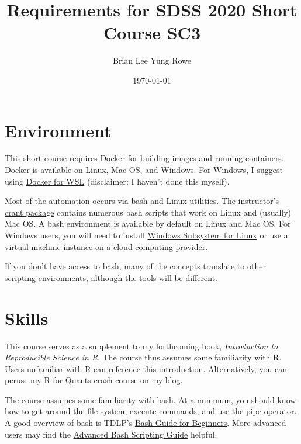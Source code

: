 \documentclass{article}
\title{Requirements for SDSS 2020 Short Course SC3}
\date{\today}
\author{Brian Lee Yung Rowe}
\begin{document}
 
\maketitle 

\section{Environment}
This short course requires Docker for building images and running containers.
\href{https://www.docker.com/products/docker-desktop}{Docker} is available on Linux, Mac OS, and Windows.
For Windows, I suggest using \href{https://code.visualstudio.com/blogs/2020/03/02/docker-in-wsl2}{Docker for WSL}
(disclaimer: I haven't done this myself).

Most of the automation occurs via bash and Linux utilities. 
The instructor's \href{https://github.com/zatonovo/crant}{crant package} 
contains numerous bash scripts that work on Linux and (usually) Mac OS.
A bash environment is available by default on Linux and Mac OS.
For Windows users, you will need to install 
\href{https://docs.microsoft.com/en-us/windows/wsl/install-win10}{Windows Subsystem for Linux} 
or use a virtual machine instance on a cloud computing provider.

If you don't have access to bash, many of the concepts translate to 
other scripting environments, although the tools will be different.

\section{Skills}
This course serves as a supplement to my forthcoming book, 
\emph{Introduction to Reproducible Science in R}.
The course thus assumes some familiarity with R.
Users unfamiliar with R can reference \href{https://cran.r-project.org/doc/manuals/r-devel/R-intro.pdf}{this introduction}.
Alternatively, you can peruse my \href{https://cartesianfaith.com/2012/02/12/r-for-quants-part-i-a/}{R for Quants crash course on my blog}.

The course assumes some familiarity with bash.
At a minimum, you should know how to get around the file system,
execute commands, and use the pipe operator.
A good overview of bash is TDLP's \href{https://www.tldp.org/LDP/Bash-Beginners-Guide/html/}{Bash Guide for Beginners}.
More advanced users may find the \href{https://tldp.org/LDP/abs/html/}{Advanced Bash Scripting Guide} helpful.
\end{document}
